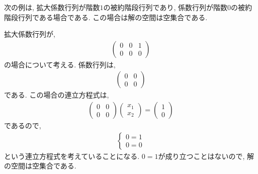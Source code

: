 次の例は,
拡大係数行列が階数$1$の被約階段行列であり,
係数行列が階数$0$の被約階段行列である場合である.
この場合は解の空間は空集合である.
\begin{example}
  \label{eg:eq:reduced:6}
  拡大係数行列が,
  \begin{align*}
    \begin{pmatrix}
      0&0&1\\0&0&0
    \end{pmatrix}
  \end{align*}
  の場合について考える.
  係数行列は,
  \begin{align*}
    \begin{pmatrix}
      0&0\\0&0
    \end{pmatrix}
  \end{align*}
  である.
  この場合の連立方程式は,
  \begin{align*}
    \begin{pmatrix}
      0&0\\0&0
    \end{pmatrix}
    \begin{pmatrix}x_1\\x_2\end{pmatrix}
      =
      \begin{pmatrix}
        1\\0
      \end{pmatrix}
  \end{align*}
  であるので,
  \begin{align*}
    \begin{cases}
      0=1\\
      0=0
    \end{cases}
  \end{align*}
  という連立方程式を考えていることになる.
  $0=1$が成り立つことはないので,
  解の空間は空集合である.
\end{example}

